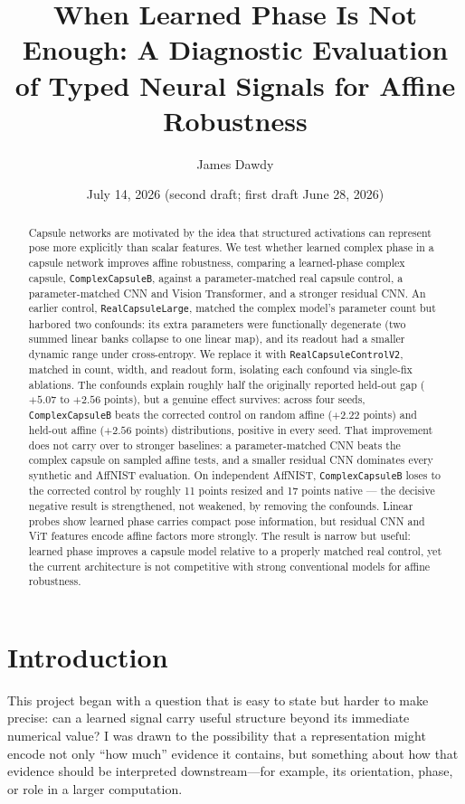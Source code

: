 \documentclass[11pt]{article}
\title{When Learned Phase Is Not Enough: A Diagnostic Evaluation of Typed Neural Signals for Affine Robustness}
\author{James Dawdy}
\date{July 14, 2026 (second draft; first draft June 28, 2026)}
\begin{document}
\maketitle

\begin{abstract}
Capsule networks are motivated by the idea that structured activations can represent pose more explicitly than scalar features. We test whether learned complex phase in a capsule network improves affine robustness, comparing a learned-phase complex capsule, \texttt{ComplexCapsuleB}, against a parameter-matched real capsule control, a parameter-matched CNN and Vision Transformer, and a stronger residual CNN. An earlier control, \texttt{RealCapsuleLarge}, matched the complex model's parameter count but harbored two confounds: its extra parameters were functionally degenerate (two summed linear banks collapse to one linear map), and its readout had a smaller dynamic range under cross-entropy. We replace it with \texttt{RealCapsuleControlV2}, matched in count, width, and readout form, isolating each confound via single-fix ablations. The confounds explain roughly half the originally reported held-out gap ($+5.07$ to $+2.56$ points), but a genuine effect survives: across four seeds, \texttt{ComplexCapsuleB} beats the corrected control on random affine ($+2.22$ points) and held-out affine ($+2.56$ points) distributions, positive in every seed. That improvement does not carry over to stronger baselines: a parameter-matched CNN beats the complex capsule on sampled affine tests, and a smaller residual CNN dominates every synthetic and AffNIST evaluation. On independent AffNIST, \texttt{ComplexCapsuleB} loses to the corrected control by roughly 11 points resized and 17 points native --- the decisive negative result is strengthened, not weakened, by removing the confounds. Linear probes show learned phase carries compact pose information, but residual CNN and ViT features encode affine factors more strongly. The result is narrow but useful: learned phase improves a capsule model relative to a properly matched real control, yet the current architecture is not competitive with strong conventional models for affine robustness.
\end{abstract}

\section{Introduction}
This project began with a question that is easy to state but harder to make precise: can a learned signal carry useful structure beyond its immediate numerical value? I was drawn to the possibility that a representation might encode not only ``how much'' evidence it contains, but something about how that evidence should be interpreted downstream---for example, its orientation, phase, or role in a larger computation.
\end{document}
